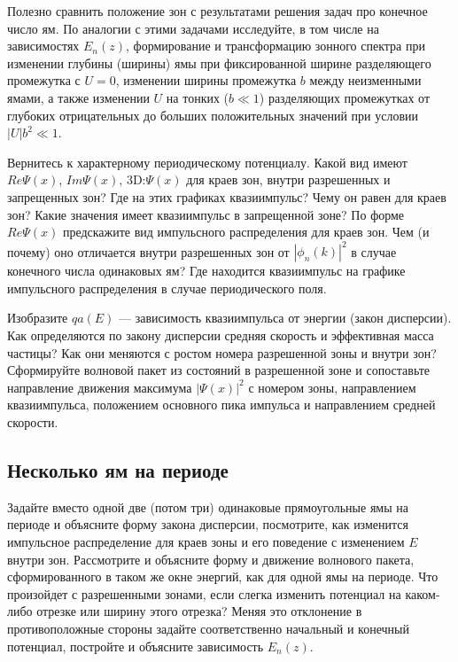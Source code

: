 \documentclass[12pt]{article}
\begin{document}
Полезно сравнить положение зон с результатами решения задач про
конечное число ям. По аналогии с этими задачами исследуйте, в том
числе на зависимостях $E_n(z)$, формирование и трансформацию
зонного спектра при изменении глубины (ширины) ямы при
фиксированной ширине разделяющего промежутка с $U=0$, изменении
ширины промежутка $b$ между неизменными ямами, а также изменении
$U$ на тонких ($b\ll1$) разделяющих промежутках от глубоких
отрицательных до больших положительных значений при
условии $|U|b^2\ll1$.

Вернитесь к характерному периодическому потенциалу. Какой  вид
имеют $Re \Psi(x)$, $Im \Psi(x)$, 3D:$\Psi(x)$ для краев зон,
внутри разрешенных и запрещенных зон? Где на этих графиках
квазиимпульс? Чему он равен для краев зон? Какие значения имеет
квазиимпульс в запрещенной зоне? По форме $Re \Psi(x)$
предскажите   вид   импульсного распределения для краев зон. Чем
(и почему) оно отличается внутри  разрешенных зон от $|\phi_n(k)|
^2$ в случае конечного числа одинаковых ям? Где находится
квазиимпульс на графике импульсного распределения в случае
периодического поля.

Изобразите $qa(E)$ ---  зависимость квазиимпульса от энергии
(закон дисперсии). Как определяются по закону дисперсии средняя
скорость и эффективная масса частицы?
Как они меняются с ростом номера разрешенной зоны и внутри зон?
Сформируйте волновой пакет из состояний в разрешенной зоне и
сопоставьте направление движения максимума $|\Psi(x)|^2$ с
номером зоны, направлением квазиимпульса, положением основного
пика импульса и направлением средней скорости.

\hypertarget{Periodical_Nwell}{}\subsection{Несколько ям на
периоде}
Задайте вместо одной две (потом три) одинаковые прямоугольные ямы
на периоде и объясните форму закона дисперсии, посмотрите, как
изменится импульсное распределение для краев зоны и его поведение
с изменением $E$ внутри зон. Рассмотрите и объясните форму и
движение волнового пакета, сформированного в таком же окне
энергий, как для одной ямы на периоде. Что произойдет с
разрешенными зонами, если слегка изменить потенциал на каком-либо
отрезке или ширину этого отрезка? Меняя это отклонение в
противоположные стороны задайте соответственно начальный и
конечный потенциал, постройте и объясните зависимость $E_n(z)$.
\end{document}
